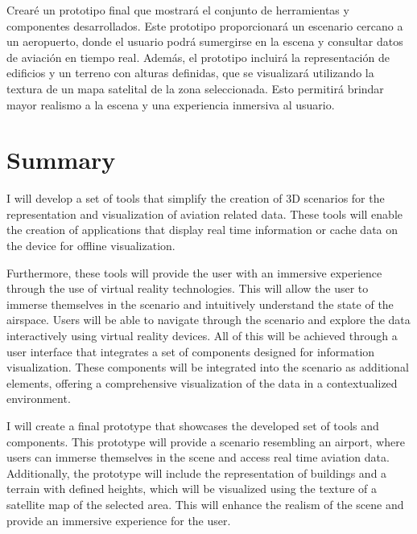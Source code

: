 \documentclass[a4paper, 11pt]{book}
\begin{document}
Crearé un prototipo final que mostrará el conjunto de herramientas y componentes desarrollados. Este prototipo proporcionará un escenario cercano a un aeropuerto, donde el usuario podrá sumergirse en la escena y consultar datos de aviación en tiempo real. Además, el prototipo incluirá la representación de edificios y un terreno con alturas definidas, que se visualizará utilizando la textura de un mapa satelital de la zona seleccionada. Esto permitirá brindar mayor realismo a la escena y una experiencia inmersiva al usuario.


\chapter*{Summary}

I will develop a set of tools that simplify the creation of \gls{3D} scenarios for the representation and visualization of aviation related data. These tools will enable the creation of applications that display real time information or cache data on the device for offline visualization.

Furthermore, these tools will provide the user with an immersive experience through the use of virtual reality technologies. This will allow the user to immerse themselves in the scenario and intuitively understand the state of the airspace. Users will be able to navigate through the scenario and explore the data interactively using virtual reality devices. All of this will be achieved through a user interface that integrates a set of components designed for information visualization. These components will be integrated into the scenario as additional elements, offering a comprehensive visualization of the data in a contextualized environment.

I will create a final prototype that showcases the developed set of tools and components. This prototype will provide a scenario resembling an airport, where users can immerse themselves in the scene and access real time aviation data. Additionally, the prototype will include the representation of buildings and a terrain with defined heights, which will be visualized using the texture of a satellite map of the selected area. This will enhance the realism of the scene and provide an immersive experience for the user.
\end{document}
